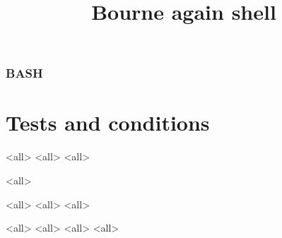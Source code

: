 
\title[bash]{Bourne again shell}




\begin{frame}
	\frametitle{BASH}
	\titlepage
	\vspace{-0.5cm}
	\begin{center}
	\end{center}
\end{frame}

\begin{frame}
	\tableofcontents
\end{frame}





\section{Tests and conditions}
\mode<all>{}
\mode<all>{}
\mode<all>{}

\mode<all>{}


\mode<all>{}
\mode<all>{}
\mode<all>{}

\mode<all>{}
\mode<all>{}
\mode<all>{}
\mode<all>{}

